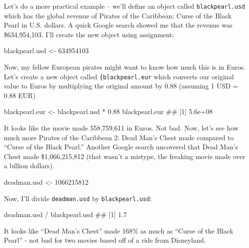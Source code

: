 \documentclass[]{book}
\newenvironment{Shaded}{\begin{snugshade}}{\end{snugshade}}
\newcommand{\DecValTok}[1]{\textcolor[rgb]{0.00,0.00,0.81}{{#1}}}
\newcommand{\FloatTok}[1]{\textcolor[rgb]{0.00,0.00,0.81}{{#1}}}
\newcommand{\StringTok}[1]{\textcolor[rgb]{0.31,0.60,0.02}{{#1}}}
\newcommand{\NormalTok}[1]{{#1}}
\theoremstyle{definition}
\theoremstyle{definition}
\theoremstyle{remark}
\begin{document}
Let's do a more practical example -- we'll define an object called
\texttt{blackpearl.usd} which has the global revenue of Pirates of the
Caribbean: Curse of the Black Pearl in U.S. dollars. A quick Google
search showed me that the revenue was \$634,954,103. I'll create the new
object using assignment:

\begin{Shaded}
\begin{Highlighting}[]
\NormalTok{blackpearl.usd <-}\StringTok{ }\DecValTok{634954103}
\end{Highlighting}
\end{Shaded}

Now, my fellow European pirates might want to know how much this is in
Euros. Let's create a new object called \texttt{\{blackpearl.eur} which
converts our original value to Euros by multiplying the original amount
by 0.88 (assuming 1 USD = 0.88 EUR)

\begin{Shaded}
\begin{Highlighting}[]
\NormalTok{blackpearl.eur <-}\StringTok{ }\NormalTok{blackpearl.usd *}\StringTok{ }\FloatTok{0.88}
\NormalTok{blackpearl.eur}
\NormalTok{## [1] 5.6e+08}
\end{Highlighting}
\end{Shaded}

It looks like the movie made 558,759,611 in Euros. Not bad. Now, let's
see how much more Pirates of the Caribbean 2: Dead Man's Chest made
compared to ``Curse of the Black Pearl.'' Another Google search
uncovered that Dead Man's Chest made \$1,066,215,812 (that wasn't a
mistype, the freaking movie made over a billion dollars).

\begin{Shaded}
\begin{Highlighting}[]
\NormalTok{deadman.usd <-}\StringTok{ }\DecValTok{1066215812}
\end{Highlighting}
\end{Shaded}

Now, I'll divide \texttt{deadman.usd} by \texttt{blackpearl.usd}:

\begin{Shaded}
\begin{Highlighting}[]
\NormalTok{deadman.usd /}\StringTok{ }\NormalTok{blackpearl.usd}
\NormalTok{## [1] 1.7}
\end{Highlighting}
\end{Shaded}

It looks like ``Dead Man's Chest'' made 168\% as much as ``Curse of the
Black Pearl'' - not bad for two movies based off of a ride from
Disneyland.
\end{document}

